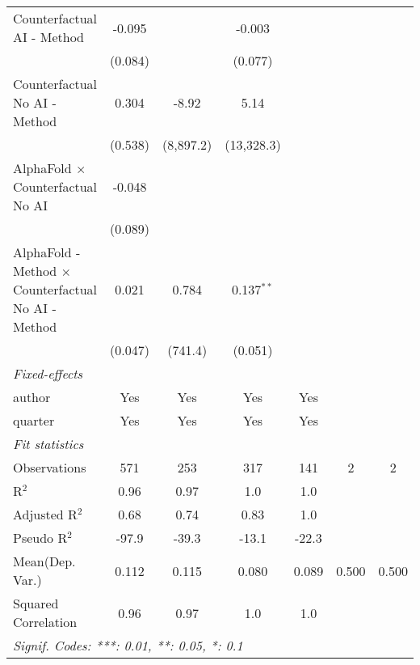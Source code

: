 \begin{tabular}{lcccccc}
   Counterfactual AI - Method                                 & -0.095  &           & -0.003        &                &     &   \\   
                                                              & (0.084) &           & (0.077)       &                &     &   \\   
   Counterfactual No AI - Method                              & 0.304   & -8.92     & 5.14          &                &     &   \\   
                                                              & (0.538) & (8,897.2) & (13,328.3)    &                &     &   \\   
   AlphaFold $\times$ Counterfactual No AI                    & -0.048  &           &               &                &     &   \\   
                                                              & (0.089) &           &               &                &     &   \\   
   AlphaFold - Method $\times$ Counterfactual No AI - Method  & 0.021   & 0.784     & 0.137$^{**}$  &                &     &   \\   
                                                              & (0.047) & (741.4)   & (0.051)       &                &     &   \\   
   \midrule
   \emph{Fixed-effects}\\
   author                                                     & Yes     & Yes       & Yes           & Yes            &     & \\  
   quarter                                                    & Yes     & Yes       & Yes           & Yes            &     & \\  
   \midrule
   \emph{Fit statistics}\\
   Observations                                               & 571     & 253       & 317           & 141            & 2   & 2\\  
   R$^2$                                                      & 0.96    & 0.97      & 1.0           & 1.0            &     & \\  
   Adjusted R$^2$                                             & 0.68    & 0.74      & 0.83          & 1.0            &     & \\  
   Pseudo R$^2$                                               & -97.9   & -39.3     & -13.1         & -22.3          &     & \\  
Mean(Dep. Var.) & 0.112 & 0.115 & 0.080 & 0.089 & 0.500 & 0.500 \\
   Squared Correlation                                        & 0.96    & 0.97      & 1.0           & 1.0            &     & \\  
   \midrule \midrule
   \multicolumn{7}{l}{\emph{Signif. Codes: ***: 0.01, **: 0.05, *: 0.1}}\\
\end{tabular}
\par\endgroup
